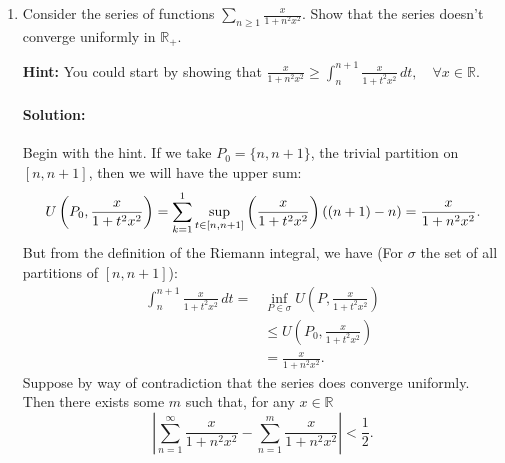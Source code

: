 \documentclass{article}
\begin{document}
\begin{enumerate}
\begin{enumerate}
        \iffalse
        \begin{align*}
            F'(x)&= \frac{d}{dx}\left(  \sum_{k=1}^{\infty} \frac{x}{k(k+x)}\right)  \\
                &= \frac{d}{dx}\left( \lim_{n \to \infty} \sum_{k=1}^{n} \frac{x}{k(k+x)}\right)  \\
                &= \lim_{n \to \infty}\left( \frac{d}{dx}\sum_{k=1}^{n} \frac{x}{k(k+x)}  \right)\\
                &= \lim_{n \to \infty} \sum_{k=1}^{n} \frac{d}{dx}\frac{x}{k(k+x)}  \\
                &= \lim_{n \to \infty} \sum_{k=1}^{n} \frac{k(x+k)-kx}{k^2(k+x)^2}  \\
                &= \lim_{n \to \infty} \sum_{k=1}^{n} \frac{k}{k^2(k+x)^2}  \\
                &= \lim_{n \to \infty} \sum_{k=1}^{n} \frac{1}{k(k+x)^2}  \\
                &= \sum_{k=1}^{\infty} \frac{1}{k(k+x)^2} 
        .\end{align*}
    \fi

  \end{enumerate}
  \newpage
\item Consider the series of functions $\sum_{n\geq 1}^{} \frac{x}{1+n^2x^2}$. Show that the series doesn't converge uniformly in $\mathbb{R}_+$.

  \textbf{Hint:} You could start by showing that $\frac{x}{1+n^2x^2}\geq \int_{n}^{n+1} \frac{x}{1+t^2x^2} \, d t, \quad \forall x\in \mathbb{R}$.

  \paragraph{Solution: }Begin with the hint. If we take $P_{0}=\{n,n+1\} $, the trivial partition on $[n,n+1]$, then we will have the upper sum:
  \[
       U\left(P_0,\frac{x}{1+t^2x^2}\right)=\sum_{k=1}^{1} \sup_{t\in [n,n+1]}\left( \frac{x}{1+t^2x^2} \right) ((n+1)-n)\\
       = \frac{x}{1+n^2x^2} \\
  .\] 
  But from the definition of the Riemann integral, we have (For $\sigma$ the set of all partitions of $[n,n+1]$):
  \begin{align*}
      \int_{n}^{n+1} \frac{x}{1+t^2x^2} \, d t=&\inf_{P\in \sigma}U\left(P,\frac{x}{1+t^2x^2}\right)\\
                        &\leq U\left( P_0,\frac{x}{1+t^2x^2} \right) \\
      &= \frac{x}{1+n^2x^2}
  .\end{align*}
  Suppose by way of contradiction that the series does converge uniformly. Then there exists some $m$ such that, for any $x\in \mathbb{R}$
  \[
  \left| \sum_{n=1}^{\infty} \frac{x}{1+n^2x^2}-\sum_{n=1}^{m} \frac{x}{1+n^2x^2} \right| <\frac{1}{2}
  .\] 


\end{enumerate}
\end{document}
